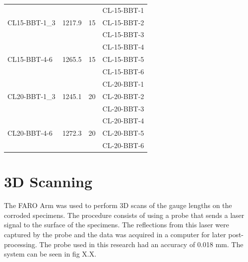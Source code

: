 \begin{table}[htbp]
\begin{tabular}{lccl}
\multirow{3}{*}{CL15-BBT-1\_3} & \multirow{3}{*}{1217.9} & \multirow{3}{*}{15} & CL-15-BBT-1           \\
                               &                         &                     & CL-15-BBT-2           \\
                               &                         &                     & CL-15-BBT-3           \\
\multirow{3}{*}{CL15-BBT-4-6}  & \multirow{3}{*}{1265.5} & \multirow{3}{*}{15} & CL-15-BBT-4           \\
                               &                         &                     & CL-15-BBT-5           \\
                               &                         &                     & CL-15-BBT-6           \\
\multirow{3}{*}{CL20-BBT-1\_3} & \multirow{3}{*}{1245.1} & \multirow{3}{*}{20} & CL-20-BBT-1           \\
                               &                         &                     & CL-20-BBT-2           \\
                               &                         &                     & CL-20-BBT-3           \\
\multirow{3}{*}{CL20-BBT-4-6}  & \multirow{3}{*}{1272.3} & \multirow{3}{*}{20} & CL-20-BBT-4           \\
                               &                         &                     & CL-20-BBT-5           \\
                               &                         &                     & CL-20-BBT-6          
\end{tabular}
\end{table}

\section{3D Scanning}

The FARO Arm \cite{FAROTechnologiesInc.2022} was used to perform 3D scans of the gauge lengths on the corroded specimens. The procedure consists of using a probe that sends a laser signal to the surface of   the specimens. The reflections from this laser were captured by the probe and the data was acquired in a computer for later post-processing. The probe used in this research had an accuracy of 0.018 mm. The system can be seen in fig X.X.

